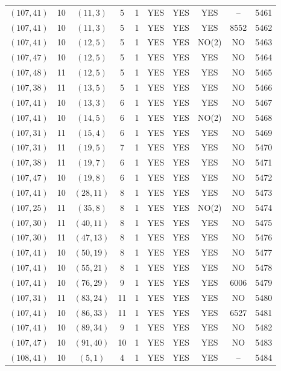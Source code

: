 \begin{longtable}{|c|c|c|c|c|c|c|c|c|c|}
$(107, 41)$ & 10 & $(11, 3)$ & 5 & 1 & YES & YES & YES & -- & 5461\\
$(107, 41)$ & 10 & $(11, 3)$ & 5 & 1 & YES & YES & YES & 8552 & 5462\\
$(107, 41)$ & 10 & $(12, 5)$ & 5 & 1 & YES & YES & NO(2) & NO & 5463\\
$(107, 47)$ & 10 & $(12, 5)$ & 5 & 1 & YES & YES & YES & NO & 5464\\
$(107, 48)$ & 11 & $(12, 5)$ & 5 & 1 & YES & YES & YES & NO & 5465\\
$(107, 38)$ & 11 & $(13, 5)$ & 5 & 1 & YES & YES & YES & NO & 5466\\
$(107, 41)$ & 10 & $(13, 3)$ & 6 & 1 & YES & YES & YES & NO & 5467\\
$(107, 41)$ & 10 & $(14, 5)$ & 6 & 1 & YES & YES & NO(2) & NO & 5468\\
$(107, 31)$ & 11 & $(15, 4)$ & 6 & 1 & YES & YES & YES & NO & 5469\\
$(107, 31)$ & 11 & $(19, 5)$ & 7 & 1 & YES & YES & YES & NO & 5470\\
$(107, 38)$ & 11 & $(19, 7)$ & 6 & 1 & YES & YES & YES & NO & 5471\\
$(107, 47)$ & 10 & $(19, 8)$ & 6 & 1 & YES & YES & YES & NO & 5472\\
$(107, 41)$ & 10 & $(28, 11)$ & 8 & 1 & YES & YES & YES & NO & 5473\\
$(107, 25)$ & 11 & $(35, 8)$ & 8 & 1 & YES & YES & NO(2) & NO & 5474\\
$(107, 30)$ & 11 & $(40, 11)$ & 8 & 1 & YES & YES & YES & NO & 5475\\
$(107, 30)$ & 11 & $(47, 13)$ & 8 & 1 & YES & YES & YES & NO & 5476\\
$(107, 41)$ & 10 & $(50, 19)$ & 8 & 1 & YES & YES & YES & NO & 5477\\
$(107, 41)$ & 10 & $(55, 21)$ & 8 & 1 & YES & YES & YES & NO & 5478\\
$(107, 41)$ & 10 & $(76, 29)$ & 9 & 1 & YES & YES & YES & 6006 & 5479\\
$(107, 31)$ & 11 & $(83, 24)$ & 11 & 1 & YES & YES & YES & NO & 5480\\
$(107, 41)$ & 10 & $(86, 33)$ & 11 & 1 & YES & YES & YES & 6527 & 5481\\
$(107, 41)$ & 10 & $(89, 34)$ & 9 & 1 & YES & YES & YES & NO & 5482\\
$(107, 47)$ & 10 & $(91, 40)$ & 10 & 1 & YES & YES & YES & NO & 5483\\
$(108, 41)$ & 10 & $(5, 1)$ & 4 & 1 & YES & YES & YES & -- & 5484\\

\end{longtable}
